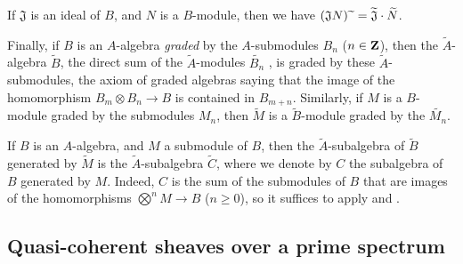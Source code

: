 \begin{env}[1.3.13]
If $\mathfrak{J}$ is an ideal of $B$, and $N$ is a $B$-module, then we have $(\mathfrak{J}N){\,\widetilde{\,}\,}=\widetilde{\mathfrak{J}}\cdot\widetilde{N}$.

Finally, if $B$ is an $A$-algebra \emph{graded} by the $A$-submodules $B_n$ ($n\in\mathbf{Z}$), then the $\widetilde{A}$-algebra $\widetilde{B}$, the direct sum of the $\widetilde{A}$-modules $\widetilde{B_n}$ , is graded by these $\widetilde{A}$-submodules, the axiom of graded algebras saying that the image of the homomorphism $B_m\otimes B_n\to B$ is contained in $B_{m+n}$.
Similarly, if $M$ is a $B$-module graded by the submodules $M_n$, then $\widetilde{M}$ is a $\widetilde{B}$-module graded by the $\widetilde{M_n}$.
\end{env}

\begin{env}[1.3.14]
\label{I.1.3.14}
If $B$ is an $A$-algebra, and $M$ a submodule of $B$, then the $\widetilde{A}$-subalgebra of $\widetilde{B}$ generated by $\widetilde{M}$  is the $\widetilde{A}$-subalgebra $\widetilde{C}$, where we denote by $C$ the subalgebra of $B$ generated by $M$.
Indeed, $C$ is the sum of the submodules of $B$ that are images of the homomorphisms $\bigotimes^n M\to B$ ($n\geq 0$), so it suffices to apply  and .
\end{env}

\subsection{Quasi-coherent sheaves over a prime spectrum}
\label{subsection:I.1.4}

